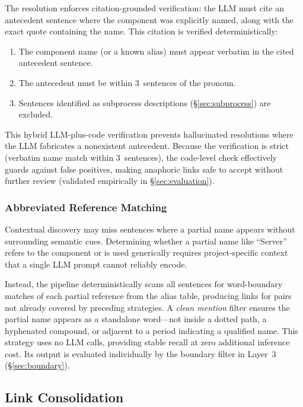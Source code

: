 The resolution enforces citation-grounded verification:
the LLM must cite an antecedent sentence where the component was
explicitly named, along with the exact quote containing the name.
This citation is verified deterministically:
\begin{enumerate}
    \item The component name (or a known alias) must appear verbatim in
      the cited antecedent sentence.
    \item The antecedent must be within 3~sentences of the pronoun.
    \item Sentences identified as subprocess descriptions
      (\S\ref{sec:subprocess}) are excluded.
\end{enumerate}

\noindent This hybrid LLM-plus-code verification prevents hallucinated
resolutions where the LLM fabricates a nonexistent antecedent.
Because the verification is strict (verbatim name match within
3~sentences), the code-level check effectively guards against false
positives, making anaphoric links safe to accept without further review
(validated empirically in \S\ref{sec:evaluation}).

\subsubsection{Abbreviated Reference Matching}\label{sec:partial}

Contextual discovery may miss sentences where a partial name appears
without surrounding semantic cues.
Determining whether a partial name like ``Server'' refers to the
component or is used generically requires project-specific context
that a single LLM prompt cannot reliably encode.

Instead, the pipeline deterministically scans all sentences for
word-boundary matches of each partial reference from the alias table,
producing links for pairs not already covered by preceding strategies.
A \emph{clean mention} filter ensures the partial name appears as a
standalone word---not inside a dotted path, a hyphenated compound,
or adjacent to a period indicating a qualified name.
This strategy uses no LLM calls, providing stable recall at zero
additional inference cost.
Its output is evaluated individually by the boundary filter in
Layer~3 (\S\ref{sec:boundary}).


\subsection{Link Consolidation}\label{sec:merge}


